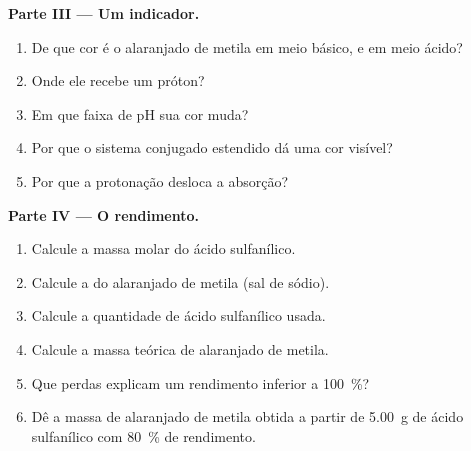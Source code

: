 \begin{problem}
\medskip
\noindent\textbf{Parte III --- Um indicador.}
\begin{enumerate}[resume]
  \item De que cor é o alaranjado de metila em meio básico, e em meio ácido?
  \item Onde ele recebe um próton?
  \item Em que faixa de pH sua cor muda?
  \item Por que o sistema conjugado estendido dá uma cor visível?
  \item Por que a protonação desloca a absorção?
\end{enumerate}

\medskip
\noindent\textbf{Parte IV --- O rendimento.}
\begin{enumerate}[resume]
  \item Calcule a massa molar do ácido sulfanílico.
  \item Calcule a do alaranjado de metila (sal de sódio).
  \item Calcule a quantidade de ácido sulfanílico usada.
  \item Calcule a massa teórica de alaranjado de metila.
  \item Que perdas explicam um rendimento inferior a 100~\%?
  \item Dê a massa de alaranjado de metila obtida a partir de \qty{5.00}{g} de
        ácido sulfanílico com 80~\% de rendimento.
\end{enumerate}
\end{problem}
